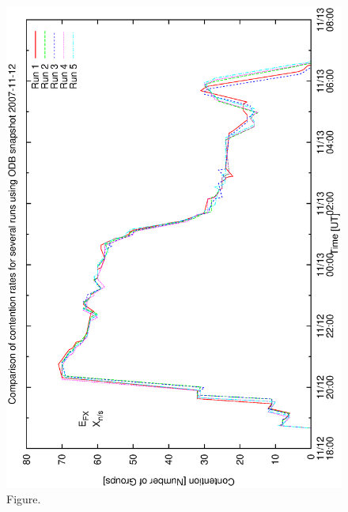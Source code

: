 \documentclass[12pt,a4paper]{article}
\begin{document}
\begin{figure}[htbp]
 \begin{center}
  \includegraphics[scale=1.0, angle=0]{figures/bsa1_ex.eps}
 \end{center}
  \caption[Figure.]
{Figure.}
\end{figure}
\clearpage
\end{document}
